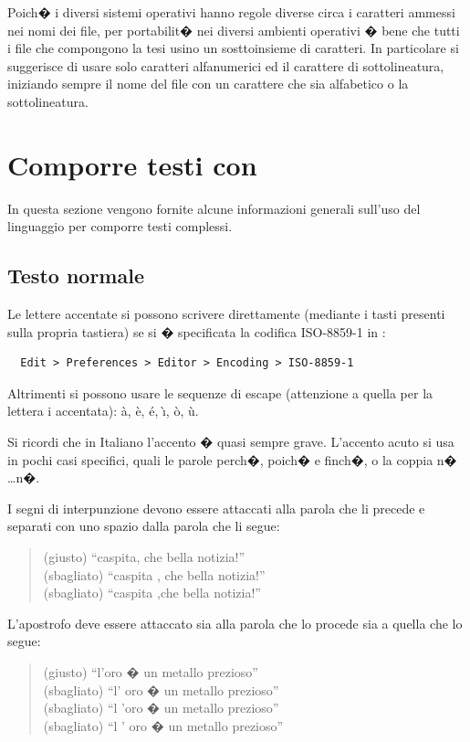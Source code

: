 Poich� i diversi sistemi operativi hanno regole diverse circa i caratteri ammessi nei nomi dei file, per portabilit� nei diversi ambienti operativi � bene che tutti i file che compongono la tesi usino un sosttoinsieme di caratteri.
In particolare si suggerisce di usare solo caratteri alfanumerici  ed il carattere di sottolineatura, iniziando sempre il nome del file con un carattere che sia alfabetico o la sottolineatura.


\section{Comporre testi con \ltx}

In questa sezione vengono fornite alcune informazioni generali sull'uso del linguaggio \ltx per comporre testi complessi.


\subsection{Testo normale}

Le lettere accentate si possono scrivere direttamente (mediante i tasti presenti sulla propria tastiera) se si � specificata la codifica ISO-8859-1 in \mik:
\begin{verbatim}
  Edit > Preferences > Editor > Encoding > ISO-8859-1
\end{verbatim}
Altrimenti si possono usare le sequenze di escape (attenzione a quella per la lettera i accentata):
\`a, \`e, \'e, \`{\i}, \`o, \`u.

Si ricordi che in Italiano l'accento � quasi sempre grave. L'accento acuto si usa in pochi casi specifici, quali le parole perch�, poich� e finch�, o la coppia n� \ldots n�.

I segni di interpunzione devono essere attaccati alla parola che li precede e separati con uno spazio dalla parola che li segue:
\begin{quote}
(giusto) ``caspita, che bella notizia!''
\\
(sbagliato) ``caspita , che bella notizia!''
\\
(sbagliato) ``caspita ,che bella notizia!''
\end{quote}

L'apostrofo deve essere attaccato sia alla parola che lo procede sia a quella che lo segue:
\begin{quote}
(giusto) ``l'oro � un metallo prezioso''
\\
(sbagliato) ``l' oro � un metallo prezioso''
\\
(sbagliato) ``l 'oro � un metallo prezioso''
\\
(sbagliato) ``l ' oro � un metallo prezioso''
\end{quote}

